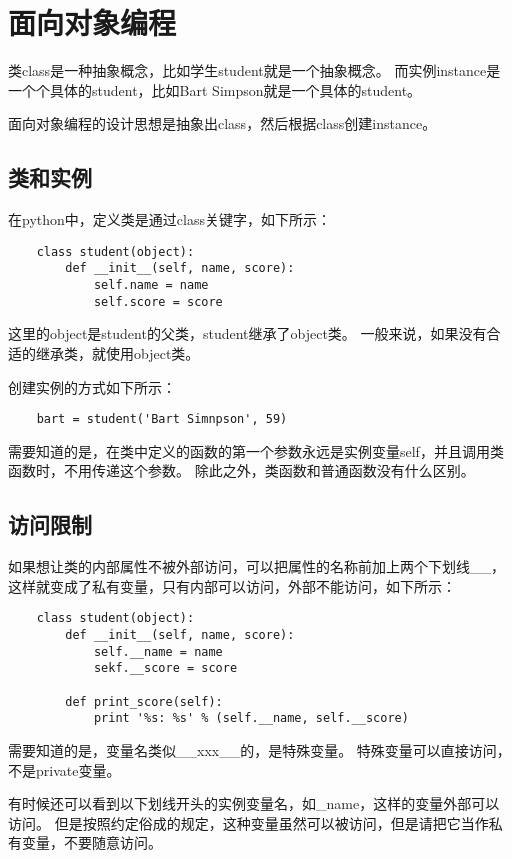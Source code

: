 \documentclass[a4paper,left=2.5cm,right=2.5cm,11pt]{article}
\begin{document}
\tableofcontents

\clearpage

\section{面向对象编程}
	类class是一种抽象概念，比如学生student就是一个抽象概念。
	而实例instance是一个个具体的student，比如Bart Simpson就是一个具体的student。\par

	面向对象编程的设计思想是抽象出class，然后根据class创建instance。

\subsection{类和实例}
	在python中，定义类是通过class关键字，如下所示：
	\begin{lstlisting}
	class student(object):
		def __init__(self, name, score):
			self.name = name
			self.score = score
	\end{lstlisting}

	这里的object是student的父类，student继承了object类。
	一般来说，如果没有合适的继承类，就使用object类。\par

	创建实例的方式如下所示：
	\begin{lstlisting}
	bart = student('Bart Simnpson', 59)
	\end{lstlisting}

	需要知道的是，在类中定义的函数的第一个参数永远是实例变量self，并且调用类函数时，不用传递这个参数。
	除此之外，类函数和普通函数没有什么区别。

\subsection{访问限制}
	如果想让类的内部属性不被外部访问，可以把属性的名称前加上两个下划线\_\_，这样就变成了私有变量，只有内部可以访问，外部不能访问，如下所示：
	\begin{lstlisting}
	class student(object):
		def __init__(self, name, score):
			self.__name = name
			sekf.__score = score

		def print_score(self):
			print '%s: %s' % (self.__name, self.__score)
	\end{lstlisting}

	需要知道的是，变量名类似\_\_xxx\_\_的，是特殊变量。
	特殊变量可以直接访问，不是private变量。\par

	有时候还可以看到以下划线开头的实例变量名，如\_name，这样的变量外部可以访问。
	但是按照约定俗成的规定，这种变量虽然可以被访问，但是请把它当作私有变量，不要随意访问。\par
\end{document}

